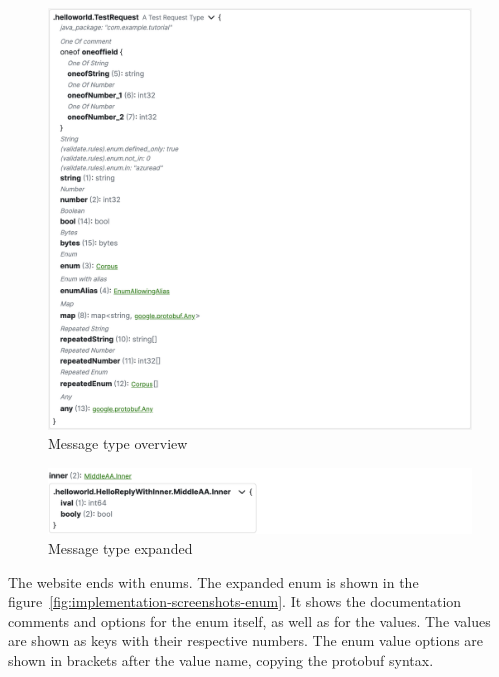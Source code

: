 \begin{figure}[hbt!]
    \centering
    \captionsetup{justification=centering}
    \includegraphics[width=1.0\textwidth]{images/implementation/screenshots/message-type}
    \caption{Message type overview}
    \label{fig:implementation-screenshots-message-type}
\end{figure}

\begin{figure}[hbt!]
    \centering
    \captionsetup{justification=centering}
    \includegraphics[width=1.0\textwidth]{images/implementation/screenshots/message-type-field-expansion}
    \caption{Message type expanded}
    \label{fig:implementation-screenshots-message-type-field-expansion}
\end{figure}

The website ends with enums.
The expanded enum is shown in the figure~\ref{fig:implementation-screenshots-enum}.
It shows the documentation comments and options for the enum itself, as well as for the values.
The values are shown as keys with their respective numbers.
The enum value options are shown in brackets after the value name, copying the protobuf syntax.

